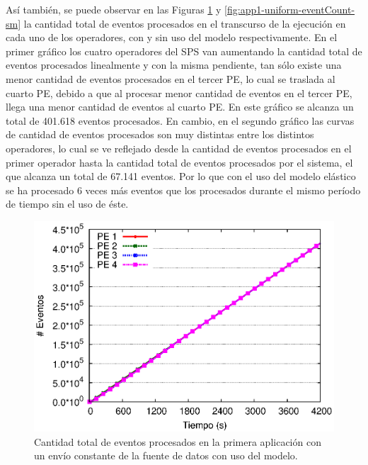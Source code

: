 Así también, se puede observar en las Figuras \ref{fig:app1-uniform-eventCount-cm} y \ref{fig:app1-uniform-eventCount-sm} la cantidad total de eventos procesados en el transcurso de la ejecución en cada uno de los operadores, con y sin uso del modelo respectivamente. En el primer gráfico los cuatro operadores del SPS van aumentando la cantidad total de eventos procesados linealmente y con la misma pendiente, tan sólo existe una menor cantidad de eventos procesados en el tercer PE, lo cual se traslada al cuarto PE, debido a que al procesar menor cantidad de eventos en el tercer PE, llega una menor cantidad de eventos al cuarto PE. En este gráfico se alcanza un total de 401.618 eventos procesados. En cambio, en el segundo gráfico las curvas de cantidad de eventos procesados son muy distintas entre los distintos operadores, lo cual se ve reflejado desde la cantidad de eventos procesados en el primer operador hasta la cantidad total de eventos procesados por el sistema, el que alcanza un total de 67.141 eventos. Por lo que con el uso del modelo elástico se ha procesado 6 veces más eventos que los procesados durante el mismo período de tiempo sin el uso de éste.

\begin{figure}[!ht]
	\centering
    \includegraphics[scale=0.7]{images/exp/app1/uniform/cm/eventCount.eps}
    \caption{Cantidad total de eventos procesados en la primera aplicación con un envío constante de la fuente de datos con uso del modelo.}
    \label{fig:app1-uniform-eventCount-cm}
\end{figure}


